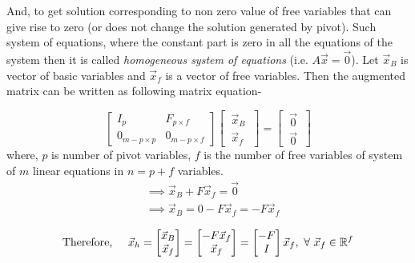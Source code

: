 \documentclass{article}
\begin{document}
And, to get solution corresponding to non zero value of free variables that can give rise to zero (or does not change the solution generated by pivot). Such system of equations, where the constant part is zero in all the equations of the system then it is called \textit{homogeneous system of equations} (i.e. $A\vec{x}=\vec{0}$). Let $\vec{x}_B$ is vector of basic variables and $\vec{x}_f$ is a vector of free variables. Then the augmented matrix can be written as following matrix equation-

\[
\left[\begin{array}{c|c}
    I_p &F_{p\times f} \\
    \hline 
    0_{m-p\times p} & 0_{m-p\times f} 
  \end{array}\right] \begin{bmatrix}
                            ~\vec{x}_B~\\
                            \hline
                            ~\vec{x}_f~
                          \end{bmatrix}= \begin{bmatrix}
                            ~\vec{0}~\\
                            \hline
                            ~\vec{0}~
                          \end{bmatrix}
\]
where, $p$ is number of pivot variables, $f$ is the number of free variables of system of $m$ linear equations in $n=p+f$ variables.
\begin{align*}
&\implies \vec{x}_B + F\vec{x}_f = \vec{0} \\
&\implies \vec{x}_B = 0 - F\vec{x}_f = -F\vec{x}_f\\
\end{align*}
\[
\text{Therefore,\hspace{5mm}}  \vec{x}_h =  
\begin{bmatrix}
    \vec{x}_B\\ 
    \vec{x}_f
\end{bmatrix} = \begin{bmatrix}
                -F\vec{x}_f\\\vec{x}_f
                \end{bmatrix} = \begin{bmatrix}
                                                    -F\\I
                                                \end{bmatrix} \vec{x}_f, ~\forall ~ \vec{x}_f \in \mathbb{R}^f\]
\\
\end{document}
